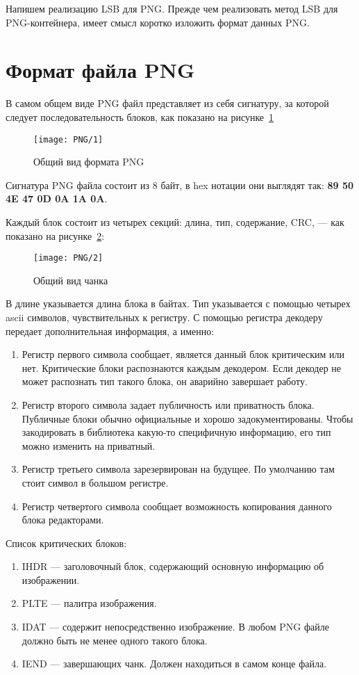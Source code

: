 Напишем реализацию LSB для PNG. Прежде чем реализовать метод LSB для PNG-контейнера,
имеет смысл коротко изложить формат данных PNG.

\section{Формат файла PNG}

В самом общем виде PNG файл представляет из себя сигнатуру,
за которой следует последовательность блоков,
как показано на рисунке~\ref{img:png_1}
\begin{figure}[ht!]
    \caption{Общий вид формата PNG}
    \texttt{[image: PNG/1]}
    \centering
    \label{img:png_1}
\end{figure}

Сигнатура PNG файла состоит из 8 байт, в hex нотации они выглядят так:
\textbf{89 50 4E 47 0D 0A 1A 0A}.

Каждый блок состоит из четырех секций: длина, тип, содержание, CRC, --- как показано на рисунке~\ref{img:png_2}:
\begin{figure}[ht!]
    \caption{Общий вид чанка}
    \texttt{[image: PNG/2]}
    \centering
    \label{img:png_2}
\end{figure}
В длине указывается длина блока в байтах. Тип указывается с помощью четырех ascii символов,
чувствительных к регистру. С помощью регистра декодеру передает дополнительная информация, а именно:
\begin{enumerate}
    \item Регистр первого символа сообщает, является данный блок критическим или нет. Критические
    блоки распознаются каждым декодером. Если декодер не может распознать тип такого блока,
    он аварийно завершает работу.
    \item Регистр второго символа задает публичность или приватность блока.
    Публичные блоки обычно официальные и хорошо задокументированы. Чтобы закодировать в библиотека
    какую-то специфичную информацию, его тип можно изменить на приватный.
    \item Регистр третьего символа зарезервирован на будущее. По умолчанию там стоит символ в большом регистре.
    \item Регистр четвертого символа сообщает возможность копирования данного блока редакторами.
\end{enumerate}

Список критических блоков:
\begin{enumerate}
    \item IHDR --- заголовочный блок, содержающий основную информацию об изображении.
    \item PLTE --- палитра изображения.
    \item IDAT --- содержит непосредственно изображение.
    В любом PNG файле должно быть не менее одного такого блока.
    \item IEND --- завершающих чанк. Должен находиться в самом конце файла.
\end{enumerate}

